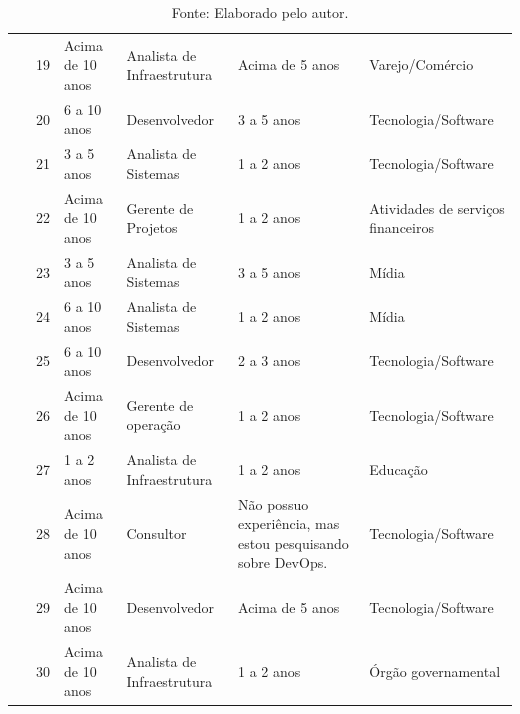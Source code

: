 \documentclass[twoside,english,brazilian]{UNISINOSartigo}
\newcommand{\source}[1]{\caption*{Fonte: {#1}} }
\begin{document}
\begin{table}[h]
\begin{tabularx}{\textwidth}{llll>{\raggedright}Xl}
~ & 19 & Acima de 10 anos & Analista de Infraestrutura & Acima de 5 anos & Varejo/Comércio \\
~ & 20 & 6 a 10 anos & Desenvolvedor & 3 a 5 anos & Tecnologia/Software \\
~ & 21 & 3 a 5 anos & Analista de Sistemas & 1 a 2 anos & Tecnologia/Software \\
~ & 22 & Acima de 10 anos & Gerente de Projetos  & 1 a 2 anos & Atividades de serviços financeiros \\
~ & 23 & 3 a 5 anos & Analista de Sistemas & 3 a 5 anos & Mídia \\
~ & 24 & 6 a 10 anos & Analista de Sistemas & 1 a 2 anos & Mídia \\
~ & 25 & 6 a 10 anos & Desenvolvedor & 2 a 3 anos & Tecnologia/Software \\
~ & 26 & Acima de 10 anos & Gerente de operação & 1 a 2 anos & Tecnologia/Software \\
~ & 27 & 1 a 2 anos & Analista de Infraestrutura & 1 a 2 anos & Educação \\
~ & 28 & Acima de 10 anos & Consultor & Não possuo experiência, mas estou pesquisando sobre DevOps. & Tecnologia/Software \\
~ & 29 & Acima de 10 anos & Desenvolvedor  & Acima de 5 anos & Tecnologia/Software \\
~ & 30 & Acima de 10 anos & Analista de Infraestrutura  & 1 a 2 anos & Órgão governamental \\
 \hline
    \end{tabularx}
    \source{Elaborado pelo autor.}
\end{table}
\end{document}
